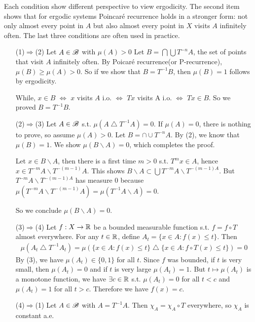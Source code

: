 \documentclass[12pt,a4paper]{report}
\newenvironment{proof}
{\begin{changemargin}{1cm}{0.5cm} 
	}%
	{\end{changemargin}
}
\begin{document}
Each condition show different perspective to view ergodicity. The second item shows that for ergodic systems Poincar\'{e} recurrence holds in a stronger form: not only almost every point in $A$ but also almost every point in $X$ visits $A$ infinitely often. The last three conditions are often used in practice.
\begin{proof}
\pf \begin{itemize}
\item[(1)$\Rightarrow$(2)] Let $A\in \mathscr{B}$ with $\mu(A) >0$ Let $B = \bigcap \bigcup T^{-n}A$, the set of points that visit $A$ infinitely often. By Poicar\'{e} recurrence(or P-recurrence), $\mu(B) \geq \mu(A) >0$. So if we show that $B = T^{-1}B$, then $\mu(B)=1$ follows by ergodicity.

\quad While, $x\in B$ $\Leftrightarrow$ $x$ visits $A$ i.o. $\Leftrightarrow$ $Tx$ visits A i.o. $\Leftrightarrow$ $Tx \in B$. So we proved $B = T^{-1}B$.
\item[(2)$\Rightarrow$(3)] Let $A\in \mathscr{B}$ s.t. $\mu(A \bigtriangleup T^{-1} A) =0$. If $\mu(A) =0$, there is nothing to prove, so assume $\mu(A)>0$. Let $B= \cap \cup T^{-n} A$. By (2), we know that $\mu(B) = 1$. We show $\mu(B\backslash A) =0$, which completes the proof.

\quad Let $x\in B\backslash A$, then there is a first time $m>0$ s.t. $T^m x\in A$, hence $x\in T^{-m}A \backslash T^{-(m-1)}A$. This shows $B\backslash A \subset \bigcup T^{-m} A \backslash T^{-(m-1)A}$. But $T^{-m} A \backslash T^{-(m-1)A}$ has measure 0 because $\mu(T^{-m} A \backslash T^{-(m-1)}A)= \mu(T^{-1}A\backslash A) =0$.

\quad So we conclude $\mu(B\backslash A) =0$.
\item[(3)$\Rightarrow$(4)] Let $f:X\rightarrow \mathbb{R}$ be a bounded measurable function s.t. $f= f\circ T$ almost everywhere. For any $t\in \mathbb{R}$, define $A_t = \{x\in A : f(x) \leq t\}$. Then
\begin{align*}
\mu(A_t \bigtriangleup T^{-1}A_t) = \mu( \{x\in A : f(x) \leq t\} \bigtriangleup \{x\in A : f \circ T(x) \leq t\}) =0
\end{align*} 
By (3), we have $\mu(A_t)\in \{0,1\}$ for all $t$. Since $f$ was bounded, if $t$ is very small, then $\mu(A_t)=0$ and if $t$ is very large $\mu(A_t) =1$. But $t\mapsto \mu(A_t)$ is a monotone function, we have $\exists c \in \mathbb{R}$ s.t. $\mu(A_t) =0$ for all $t<c$ and $\mu(A_t) =1$ for all $t>c$. Therefore we have $f(x)=c$.
\item[(4)$\Rightarrow$(1)] Let $A\in \mathscr{B}$ with $A = T^{-1}A$. Then $\chi_A = \chi_A \circ T$ everywhere, so $\chi_A$ is constant a.e.
\end{itemize}
\end{proof}
\s
\end{document}
